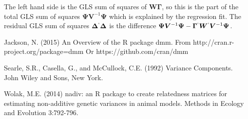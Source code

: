 \documentclass[titlepage]{article}  %
\begin{document}
The left hand side is the GLS sum of squares of $\bm{W} \bm{\Gamma}$, so this is the part of the total GLS sum of squares $\bm{\Psi} \bm{V}^{-1} \bm{\Psi}$ which is explained by the regression fit. The residual GLS sum of squares $\bm{\Delta}^{`} \bm{\Delta}$ is the difference $\bm{\Psi} \bm{V}^{-1} \bm{\Psi} - \bm{\Gamma}^{`}\bm{W}^{`} \bm{V}^{-1} \bm{\Psi}$.


\begin{thebibliography}{99}

Jackson, N. (2015) An Overview of the R package dmm.
    From http://cran.r-project.org/package=dmm 
    Or https://github.com/cran/dmm

Searle, S.R., Casella, G., and McCullock, C.E. (1992) Variance Components.
    John Wiley and Sons, New York.

Wolak, M.E. (2014) nadiv: an R package to create relatedness matrices for
    estimating non-additive genetic variances in animal models.
    Methods in Ecology and Evolution 3:792-796.
\end{thebibliography}
\end{document}
